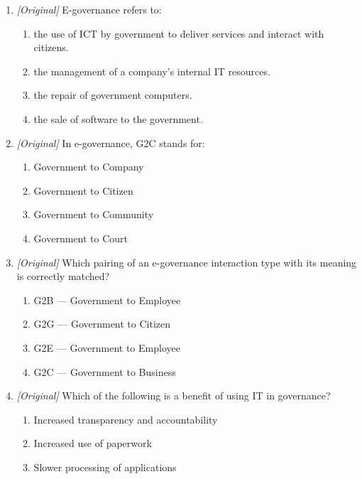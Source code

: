 \begin{enumerate}[label=\textbf{Q\arabic*.}, leftmargin=*]
\begin{enumerate}[label=\Alph*.]
      \emph{in} governance.
    \item IT governance is IT \emph{in} governance; e-governance is
      governance \emph{of} IT.
    \item They mean exactly the same thing.
    \item IT governance is a type of computer hardware.
  \end{enumerate}
\item \textit{[Original]} E-governance refers to:
  \begin{enumerate}[label=\Alph*.]
    \item the use of ICT by government to deliver services and interact with
      citizens.
    \item the management of a company's internal IT resources.
    \item the repair of government computers.
    \item the sale of software to the government.
  \end{enumerate}
\item \textit{[Original]} In e-governance, G2C stands for:
  \begin{enumerate}[label=\Alph*.]
    \item Government to Company
    \item Government to Citizen
    \item Government to Community
    \item Government to Court
  \end{enumerate}
\item \textit{[Original]} Which pairing of an e-governance interaction type
  with its meaning is correctly matched?
  \begin{enumerate}[label=\Alph*.]
    \item G2B --- Government to Employee
    \item G2G --- Government to Citizen
    \item G2E --- Government to Employee
    \item G2C --- Government to Business
  \end{enumerate}
\item \textit{[Original]} Which of the following is a benefit of using IT in
  governance?
  \begin{enumerate}[label=\Alph*.]
    \item Increased transparency and accountability
    \item Increased use of paperwork
    \item Slower processing of applications

\end{enumerate}
\end{enumerate}
